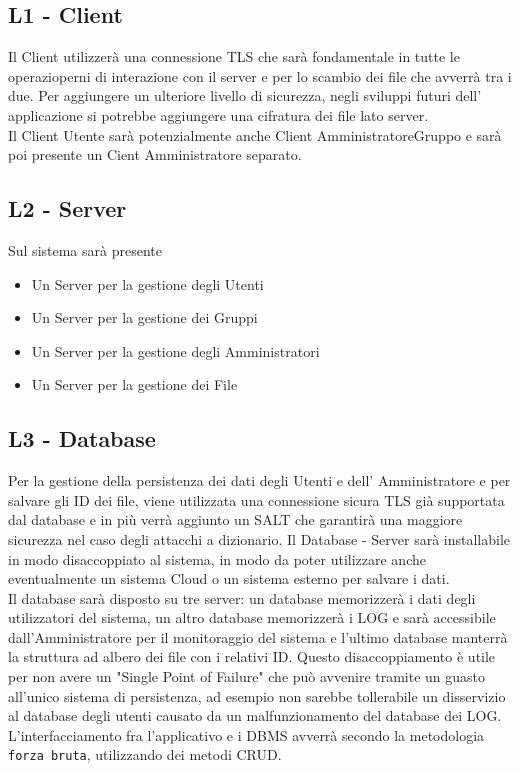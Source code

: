 \subsection*{L1 - Client}
Il Client utilizzerà una connessione TLS che sarà fondamentale in tutte le operazioperni di interazione con il server e per lo scambio dei file che avverrà tra i due.
Per aggiungere un ulteriore livello di sicurezza, negli sviluppi futuri dell' applicazione si potrebbe aggiungere una cifratura dei file lato server.
\\
Il Client Utente sarà potenzialmente anche Client AmministratoreGruppo e sarà poi presente un Cient Amministratore separato.
\vspace{0.5cm}

\subsection*{L2 - Server}
\vspace{0.5cm}
Sul sistema sarà presente
\begin{itemize}
\item Un Server per la gestione degli Utenti
\item Un Server per la gestione dei Gruppi
\item Un Server per la gestione degli Amministratori
\item Un Server per la gestione dei File
\end{itemize}
\subsection*{L3 - Database}
Per la gestione della persistenza dei dati degli Utenti e dell' Amministratore e per salvare gli ID dei file, viene utilizzata una connessione sicura TLS già supportata dal database e in più verrà aggiunto un SALT che garantirà una maggiore sicurezza nel caso degli attacchi a dizionario.
Il Database - Server sarà installabile in modo disaccoppiato al sistema, in modo da poter utilizzare anche eventualmente un sistema Cloud o un sistema esterno per salvare i dati.
\\
Il database sarà disposto su tre server: un database memorizzerà i dati degli utilizzatori del sistema, un altro database memorizzerà i LOG e sarà accessibile dall'Amministratore per il monitoraggio del sistema e l'ultimo database manterrà la struttura ad albero dei file con i relativi ID.
Questo disaccoppiamento è utile per non avere un "Single Point of Failure" che può avvenire tramite un guasto all'unico sistema di persistenza, ad esempio non sarebbe tollerabile un disservizio al database degli utenti causato da un malfunzionamento del database dei LOG.
\\
L'interfacciamento fra l'applicativo e i DBMS avverrà secondo la metodologia \verb|forza bruta|, utilizzando dei metodi CRUD.

